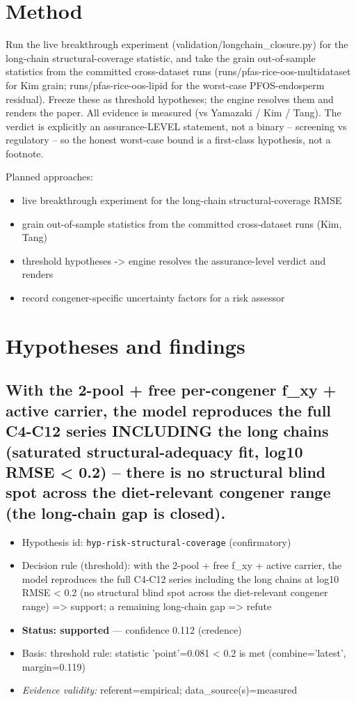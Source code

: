 \documentclass{article}
\begin{document}
\section{Method}
Run the live breakthrough experiment (validation/longchain\_closure.py) for the
long-chain structural-coverage statistic, and take the grain out-of-sample statistics
from the committed cross-dataset runs (runs/pfas-rice-oos-multidataset for Kim grain;
runs/pfas-rice-oos-lipid for the worst-case PFOS-endosperm residual). Freeze these as
threshold hypotheses; the engine resolves them and renders the paper. All evidence is
measured (vs Yamazaki / Kim / Tang). The verdict is explicitly an assurance-LEVEL
statement, not a binary -- screening vs regulatory -- so the honest worst-case bound
is a first-class hypothesis, not a footnote.

Planned approaches:
\begin{itemize}
  \item live breakthrough experiment for the long-chain structural-coverage RMSE
  \item grain out-of-sample statistics from the committed cross-dataset runs (Kim, Tang)
  \item threshold hypotheses -> engine resolves the assurance-level verdict and renders
  \item record congener-specific uncertainty factors for a risk assessor
\end{itemize}

\section{Hypotheses and findings}

\subsection{With the 2-pool + free per-congener f\_xy + active carrier, the model reproduces the full C4-C12 series INCLUDING the long chains (saturated structural-adequacy fit, log10 RMSE < 0.2) -- there is no structural blind spot across the diet-relevant congener range (the long-chain gap is closed).}
\begin{itemize}
  \item Hypothesis id: \texttt{hyp-risk-structural-coverage} (confirmatory)
  \item Decision rule (threshold): with the 2-pool + free f\_xy + active carrier, the model reproduces the full C4-C12 series including the long chains at log10 RMSE < 0.2 (no structural blind spot across the diet-relevant congener range) => support; a remaining long-chain gap => refute
  \item \textbf{Status: supported} --- confidence 0.112 (credence)
  \item Basis: threshold rule: statistic 'point'=0.081 < 0.2 is met (combine='latest', margin=0.119)
  \item \textit{Evidence validity:} referent=empirical; data\_source(s)=measured
\end{itemize}
\end{document}
